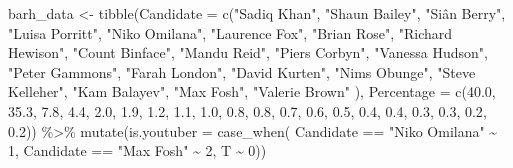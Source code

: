 \documentclass[
  letterpaper,
]{book}
\newenvironment{Shaded}{\begin{snugshade}}{\end{snugshade}}
\newcommand{\AttributeTok}[1]{\textcolor[rgb]{0.40,0.45,0.13}{#1}}
\newcommand{\DecValTok}[1]{\textcolor[rgb]{0.68,0.00,0.00}{#1}}
\newcommand{\FloatTok}[1]{\textcolor[rgb]{0.68,0.00,0.00}{#1}}
\newcommand{\FunctionTok}[1]{\textcolor[rgb]{0.28,0.35,0.67}{#1}}
\newcommand{\NormalTok}[1]{\textcolor[rgb]{0.00,0.23,0.31}{#1}}
\newcommand{\OtherTok}[1]{\textcolor[rgb]{0.00,0.23,0.31}{#1}}
\newcommand{\SpecialCharTok}[1]{\textcolor[rgb]{0.37,0.37,0.37}{#1}}
\newcommand{\StringTok}[1]{\textcolor[rgb]{0.13,0.47,0.30}{#1}}
\begin{document}
\begin{Shaded}
\begin{Highlighting}[]
\NormalTok{barh\_data }\OtherTok{\textless{}{-}} \FunctionTok{tibble}\NormalTok{(}\AttributeTok{Candidate =} \FunctionTok{c}\NormalTok{(}\StringTok{"Sadiq Khan"}\NormalTok{, }\StringTok{"Shaun Bailey"}\NormalTok{, }\StringTok{"Siân Berry"}\NormalTok{, }
\StringTok{"Luisa Porritt"}\NormalTok{, }\StringTok{"Niko Omilana"}\NormalTok{, }\StringTok{"Laurence Fox"}\NormalTok{, }\StringTok{"Brian Rose"}\NormalTok{, }
\StringTok{"Richard Hewison"}\NormalTok{, }\StringTok{"Count Binface"}\NormalTok{, }\StringTok{"Mandu Reid"}\NormalTok{, }\StringTok{"Piers Corbyn"}\NormalTok{, }
\StringTok{"Vanessa Hudson"}\NormalTok{, }\StringTok{"Peter Gammons"}\NormalTok{, }\StringTok{"Farah London"}\NormalTok{, }\StringTok{"David Kurten"}\NormalTok{, }
\StringTok{"Nims Obunge"}\NormalTok{, }\StringTok{"Steve Kelleher"}\NormalTok{, }\StringTok{"Kam Balayev"}\NormalTok{, }\StringTok{"Max Fosh"}\NormalTok{, }\StringTok{"Valerie Brown"}
\NormalTok{), }
\AttributeTok{Percentage =} \FunctionTok{c}\NormalTok{(}\FloatTok{40.0}\NormalTok{, }\FloatTok{35.3}\NormalTok{, }\FloatTok{7.8}\NormalTok{, }\FloatTok{4.4}\NormalTok{, }\FloatTok{2.0}\NormalTok{, }\FloatTok{1.9}\NormalTok{, }
\FloatTok{1.2}\NormalTok{, }\FloatTok{1.1}\NormalTok{, }\FloatTok{1.0}\NormalTok{, }\FloatTok{0.8}\NormalTok{, }\FloatTok{0.8}\NormalTok{, }\FloatTok{0.7}\NormalTok{, }\FloatTok{0.6}\NormalTok{, }\FloatTok{0.5}\NormalTok{, }\FloatTok{0.4}\NormalTok{, }
\FloatTok{0.4}\NormalTok{, }\FloatTok{0.3}\NormalTok{, }\FloatTok{0.3}\NormalTok{, }\FloatTok{0.2}\NormalTok{, }\FloatTok{0.2}\NormalTok{)) }\SpecialCharTok{\%\textgreater{}\%} \FunctionTok{mutate}\NormalTok{(}\AttributeTok{is.youtuber =} \FunctionTok{case\_when}\NormalTok{(}
\NormalTok{  Candidate }\SpecialCharTok{==} \StringTok{"Niko Omilana"} \SpecialCharTok{\textasciitilde{}} \DecValTok{1}\NormalTok{,}
\NormalTok{  Candidate }\SpecialCharTok{==} \StringTok{"Max Fosh"} \SpecialCharTok{\textasciitilde{}} \DecValTok{2}\NormalTok{,}
\NormalTok{  T }\SpecialCharTok{\textasciitilde{}} \DecValTok{0}\NormalTok{))}
\end{Highlighting}
\end{Shaded}
\end{document}
